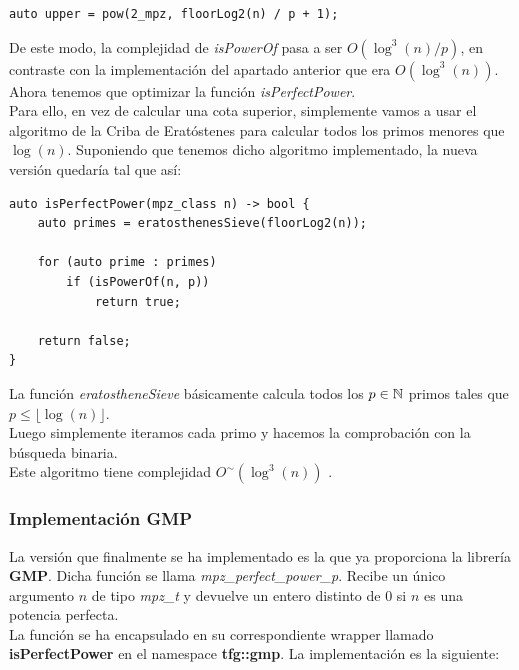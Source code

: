 \begin{lstlisting}
auto upper = pow(2_mpz, floorLog2(n) / p + 1);
\end{lstlisting}

De este modo, la complejidad de \textit{isPowerOf} pasa a ser $O(\log^3(n)/p)$, en contraste con la implementación del apartado anterior que era $O(\log^3(n))$. Ahora tenemos que optimizar la función \textit{isPerfectPower}.\\

Para ello, en vez de calcular una cota superior, simplemente vamos a usar el algoritmo de la Criba de Eratóstenes para calcular todos los primos menores que $\log(n)$. Suponiendo que tenemos dicho algoritmo implementado, la nueva versión quedaría tal que así:\\

\begin{lstlisting}
auto isPerfectPower(mpz_class n) -> bool {
	auto primes = eratosthenesSieve(floorLog2(n));
	
	for (auto prime : primes)
		if (isPowerOf(n, p))
			return true;
	
	return false;
}
\end{lstlisting}

La función \textit{eratostheneSieve} básicamente calcula todos los $p \in \mathbb{N}$ primos tales que $p \leq \lfloor \log(n) \rfloor$.\\

Luego simplemente iteramos cada primo y hacemos la comprobación con la búsqueda binaria.\\

Este algoritmo tiene complejidad $O^\sim(\log^3(n))$ \cite{bach_sorenson_1989}.

\subsubsection{Implementación GMP}

La versión que finalmente se ha implementado es la que ya proporciona la librería \textbf{GMP}. Dicha función se llama \textit{mpz\_perfect\_power\_p}. Recibe un único argumento $n$ de tipo \textit{mpz\_t} y devuelve un entero distinto de $0$ si $n$ es una potencia perfecta.\\

La función se ha encapsulado en su correspondiente wrapper llamado \textbf{isPerfectPower} en el namespace \textbf{tfg::gmp}. La implementación es la siguiente:\\

